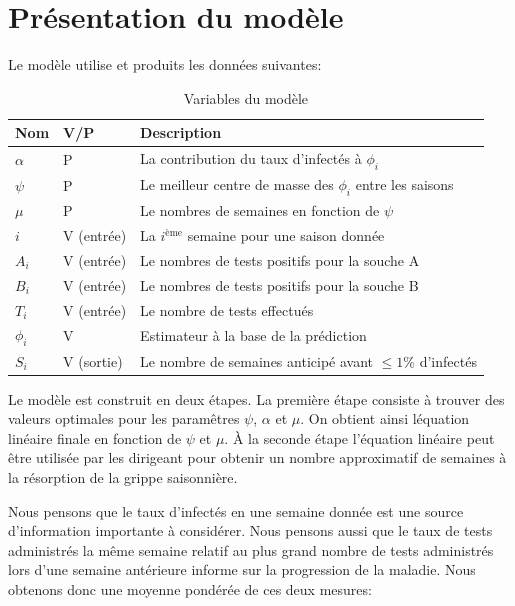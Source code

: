 \documentclass[12pt]{article}
\begin{document}
\section{Pr\'esentation du mod\`ele}
Le mod\`ele utilise et produits les donn\'ees suivantes:
\begin{table}[h]
    \centering
    \begin{tabular}{|l|l|l|}\hline
        Nom &V/P &Description\\\hline
        $\alpha$ &P &La contribution du taux d'infect\'es \`a $\phi_i$\\\hline
        $\psi$ &P &Le meilleur centre de masse des $\phi_i$ entre les saisons\\\hline
        $\mu$ &P &Le nombres de semaines en fonction de $\psi$\\\hline
        $i$ &V (entr\'ee) &La $i^{\text{\`eme}}$ semaine pour une saison donn\'ee\\\hline
        $A_i$ &V (entr\'ee) &Le nombres de tests positifs pour la souche A\\\hline
        $B_i$ &V (entr\'ee) &Le nombres de tests positifs pour la souche B\\\hline
        $T_i$ &V (entr\'ee) &Le nombre de tests effectu\'es\\\hline
        $\phi_i$ &V &Estimateur \`a la base de la pr\'ediction\\\hline
        $S_i$ &V (sortie) &Le nombre de semaines anticip\'e avant $\leq 1\%$ d'infect\'es\\\hline
    \end{tabular}
    \caption{Variables du mod\`ele}
\end{table}

Le mod\`ele est construit en deux \'etapes. La premi\`ere \'etape consiste \`a trouver des valeurs optimales pour les param\^etres $\psi$, $\alpha$ et $\mu$.
On obtient ainsi l\'equation lin\'eaire finale en fonction de $\psi$ et $\mu$. \`A la seconde \'etape l'\'equation lin\'eaire peut \^etre utilis\'ee par les dirigeant
pour obtenir un nombre approximatif de semaines \`a la r\'esorption de la grippe saisonni\`ere.

Nous pensons que le taux d'infect\'es en une semaine donn\'ee est une source d'information importante \`a consid\'erer. Nous pensons aussi que le taux de tests administr\'es
la m\^eme semaine relatif au plus grand nombre de tests administr\'es lors d'une semaine ant\'erieure informe sur la progression de la maladie.
Nous obtenons donc une moyenne pond\'er\'ee de ces deux mesures:
\end{document}
